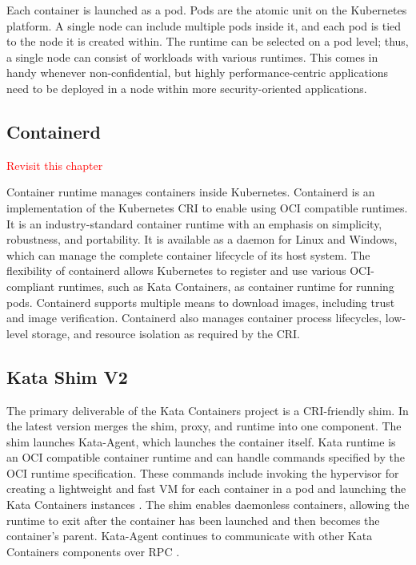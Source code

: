 Each container is launched as a pod. Pods are the atomic unit on the Kubernetes platform. A single node can include multiple pods inside it, and each pod is tied to the node it is created within. The runtime can be selected on a pod level; thus, a single node can consist of workloads with various runtimes. This comes in handy whenever non-confidential, but highly performance-centric applications need to be deployed in a node within more security-oriented applications.

\subsection{Containerd}
\textcolor{red}{Revisit this chapter}

Container runtime manages containers inside Kubernetes. Containerd is an implementation of the Kubernetes CRI to enable using OCI compatible runtimes. It is an industry-standard container runtime with an emphasis on simplicity, robustness, and portability. It is available as a daemon for Linux and Windows, which can manage the complete container lifecycle of its host system. The flexibility of containerd allows Kubernetes to register and use various OCI-compliant runtimes, such as Kata Containers, as container runtime for running pods. Containerd supports multiple means to download images, including trust and image verification. Containerd also manages container process lifecycles, low-level storage, and resource isolation as required by the CRI. \cite{containerdGithub}\cite{containerd}

\subsection{Kata Shim V2}

The primary deliverable of the Kata Containers project is a CRI-friendly shim. In the latest version merges the shim, proxy, and runtime into one component. The shim launches Kata-Agent, which launches the container itself. Kata runtime is an OCI compatible container runtime and can handle commands specified by the OCI runtime specification. These commands include invoking the hypervisor for creating a lightweight and fast VM for each container in a pod and launching the Kata Containers instances \cite{Randazzo2019}. The shim enables daemonless containers, allowing the runtime to exit after the container has been launched and then becomes the container's parent. Kata-Agent continues to communicate with other Kata Containers components over RPC \cite{KataContainersArchitecture}. \cite{Crosby}

